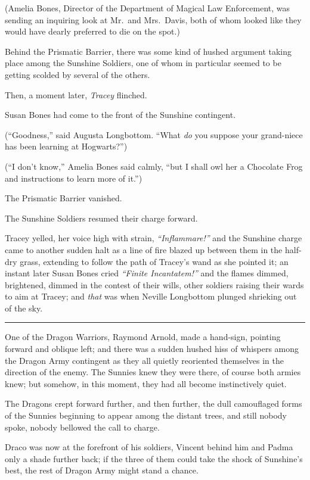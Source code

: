 (Amelia Bones, Director of the Department of Magical Law Enforcement,
was sending an inquiring look at Mr.~and Mrs.~Davis, both of whom looked
like they would have dearly preferred to die on the spot.)

Behind the Prismatic Barrier, there was some kind of hushed argument
taking place among the Sunshine Soldiers, one of whom in particular
seemed to be getting scolded by several of the others.

Then, a moment later, \emph{Tracey} flinched.

Susan Bones had come to the front of the Sunshine contingent.

(``Goodness,'' said Augusta Longbottom. ``What \emph{do} you suppose
your grand-niece has been learning at Hogwarts?'')

(``I don't know,'' Amelia Bones said calmly, ``but I shall owl her a
Chocolate Frog and instructions to learn more of it.'')

The Prismatic Barrier vanished.

The Sunshine Soldiers resumed their charge forward.

Tracey yelled, her voice high with strain, \emph{``Inflammare!''} and
the Sunshine charge came to another sudden halt as a line of fire blazed
up between them in the half-dry grass, extending to follow the path of
Tracey's wand as she pointed it; an instant later Susan Bones cried
\emph{``Finite Incantatem!''} and the flames dimmed, brightened, dimmed
in the contest of their wills, other soldiers raising their wards to aim
at Tracey; and \emph{that} was when Neville Longbottom plunged shrieking
out of the sky.

\begin{center}\rule{3in}{0.4pt}\end{center}

One of the Dragon Warriors, Raymond Arnold, made a hand-sign, pointing
forward and oblique left; and there was a sudden hushed hiss of whispers
among the Dragon Army contingent as they all quietly reoriented
themselves in the direction of the enemy. The Sunnies knew they were
there, of course both armies knew; but somehow, in this moment, they had
all become instinctively quiet.

The Dragons crept forward further, and then further, the dull
camouflaged forms of the Sunnies beginning to appear among the distant
trees, and still nobody spoke, nobody bellowed the call to charge.

Draco was now at the forefront of his soldiers, Vincent behind him and
Padma only a shade further back; if the three of them could take the
shock of Sunshine's best, the rest of Dragon Army might stand a chance.

